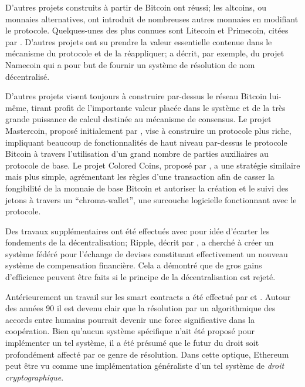 \documentclass[9pt,oneside]{amsart}
\begin{document}
\begin{multicols}{2}
D'autres projets construits à partir de Bitcoin ont réussi; les altcoins, ou monnaies alternatives, ont introduit de nombreuses autres monnaies en modifiant le protocole. Quelques-unes des plus connues sont Litecoin et Primecoin, citées par \cite{sprankel2013technical}. D'autres projets ont su prendre la valeur essentielle contenue dans le mécanisme du protocole et de la réappliquer; \cite{aron2012bitcoin} a décrit, par exemple, du projet Namecoin qui a pour but de fournir un système de résolution de nom décentralisé.

D'autres projets visent toujours à construire par-dessus le réseau Bitcoin lui-même, tirant profit de l’importante valeur placée dans le système et de la très grande puissance de calcul destinée au mécanisme de consensus. Le projet Mastercoin, proposé initialement par \cite{mastercoin2013willett}, vise à construire un protocole plus riche, impliquant beaucoup de fonctionnalités de haut niveau par-dessus le protocole Bitcoin à travers l'utilisation d'un grand nombre de parties auxiliaires au protocole de base. Le projet Colored Coins, proposé par \cite{colouredcoins2012rosenfeld}, a une stratégie similaire mais plus simple, agrémentant les règles d'une transaction afin de casser la fongibilité de la monnaie de base Bitcoin et autoriser la création  et le suivi des jetons à travers un ``chroma-wallet'', une surcouche logicielle fonctionnant avec le protocole.

Des travaux supplémentaires ont été effectués avec pour idée d'écarter les fondements de la décentralisation; Ripple, décrit par \cite{boutellier2014pirates}, a cherché à créer un système fédéré pour l'échange de devises constituant effectivement un nouveau système de compensation financière. Cela a démontré que de gros gains d'efficience peuvent être faits si le principe de la décentralisation est rejeté.

Antérieurement un travail sur les smart contracts a été effectué par \cite{szabo1997formalizing} et \cite{miller1997future}. Autour des années 90 il est devenu clair que la résolution par un algorithmique des accords entre humains pourrait devenir une force significative dans la coopération. Bien qu'aucun système spécifique n'ait été proposé pour implémenter un tel système, il a été présumé que le futur du droit soit profondément affecté par ce genre de résolution. Dans cette optique, Ethereum peut être vu comme une implémentation généraliste d'un tel système de \textit{droit cryptographique}.



\end{multicols}
\end{document}
